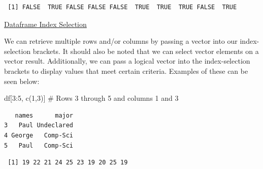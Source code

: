 \documentclass[
  letterpaper,
  DIV=11,
  numbers=noendperiod]{scrreprt}
\newenvironment{Shaded}{\begin{snugshade}}{\end{snugshade}}
\newcommand{\CommentTok}[1]{\textcolor[rgb]{0.37,0.37,0.37}{#1}}
\newcommand{\DecValTok}[1]{\textcolor[rgb]{0.68,0.00,0.00}{#1}}
\newcommand{\FunctionTok}[1]{\textcolor[rgb]{0.28,0.35,0.67}{#1}}
\newcommand{\NormalTok}[1]{\textcolor[rgb]{0.00,0.23,0.31}{#1}}
\newcommand{\SpecialCharTok}[1]{\textcolor[rgb]{0.37,0.37,0.37}{#1}}
\begin{document}
\begin{Shaded}
\end{Shaded}

\begin{verbatim}
 [1] FALSE  TRUE FALSE FALSE FALSE  TRUE  TRUE  TRUE FALSE  TRUE
\end{verbatim}

\begin{watch}{}{}
    \href{https://youtu.be/Sgaa-F_HEYo}{Dataframe Index Selection}
\end{watch}

We can retrieve multiple rows and/or columns by passing a vector into
our index-selection brackets. It should also be noted that we can select
vector elements on a vector result. Additionally, we can pass a logical
vector into the index-selection brackets to display values that meet
certain criteria. Examples of these can be seen below:

\begin{Shaded}
\begin{Highlighting}[]
\NormalTok{df[}\DecValTok{3}\SpecialCharTok{:}\DecValTok{5}\NormalTok{, }\FunctionTok{c}\NormalTok{(}\DecValTok{1}\NormalTok{,}\DecValTok{3}\NormalTok{)] }\CommentTok{\# Rows 3 through 5 and columns 1 and 3 }
\end{Highlighting}
\end{Shaded}

\begin{verbatim}
   names      major
3   Paul Undeclared
4 George   Comp-Sci
5   Paul   Comp-Sci
\end{verbatim}

\begin{Shaded}
\end{Shaded}

\begin{verbatim}
 [1] 19 22 21 24 25 23 19 20 25 19
\end{verbatim}

\begin{Shaded}
\end{Shaded}
\end{document}
